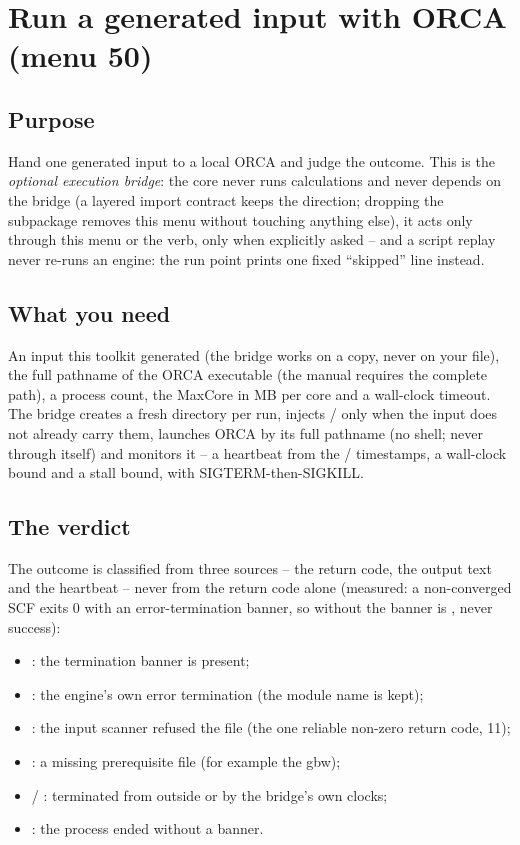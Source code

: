 \chapter{Run a generated input with ORCA (menu 50)}
\label{ch:menu50}

\section{Purpose}

Hand one generated input to a local ORCA and judge the outcome.  This is
the \emph{optional execution bridge}: the core never runs calculations and
never depends on the bridge (a layered import contract keeps the
direction; dropping the subpackage removes this menu without touching
anything else), it acts only through this menu or the  verb, only when explicitly asked -- and a script replay never
re-runs an engine: the run point prints one fixed ``skipped'' line
instead.

\section{What you need}

An input this toolkit generated (the bridge works on a copy, never on
your file), the full pathname of the ORCA executable (the manual requires
the complete path), a process count, the MaxCore in MB per core and a
wall-clock timeout.  The bridge creates a fresh 
directory per run, injects / only when the
input does not already carry them, launches ORCA by its full pathname
(no shell; never through  itself) and monitors it -- a
heartbeat from the / timestamps, a wall-clock bound
and a stall bound, with SIGTERM-then-SIGKILL.

\section{The verdict}

The outcome is classified from three sources -- the return code, the
output text and the heartbeat -- never from the return code alone
(measured: a non-converged SCF exits 0 with an error-termination banner,
so  without the banner is , never
success):

\begin{itemize}
  \item {}: the termination banner is present;
  \item {}: the engine's own error termination (the module
    name is kept);
  \item {}: the input scanner refused the file (the
    one reliable non-zero return code, 11);
  \item {}: a missing prerequisite file (for example the
     gbw);
  \item {} / : terminated from outside or by the
    bridge's own clocks;
  \item {}: the process ended without a banner.
\end{itemize}

